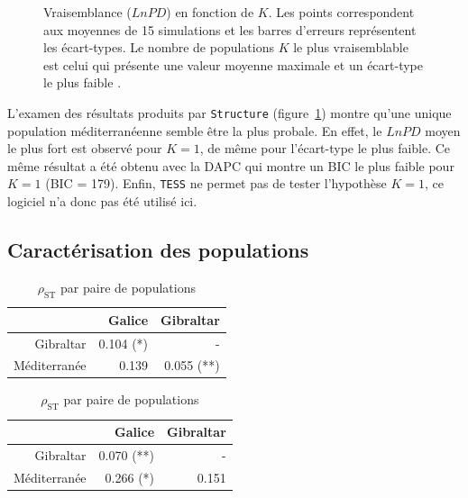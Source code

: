 \documentclass[a4paper,12pt,twoside]{article}\usepackage[]{graphicx}\usepackage[]{color}
\begin{document}
\begin {bibunit} [newbst]
\begin{figure}[htpb]
{}

\caption[Vraisemblance ($LnPD$) en fonction de $K$.]{Vraisemblance ($LnPD$) en fonction de $K$. Les points correspondent aux moyennes de 15 simulations et les barres d'erreurs représentent les écart-types. Le nombre de populations $K$ le plus vraisemblable est celui qui présente une valeur moyenne maximale et un écart-type le plus faible \citep{pritchard2000}.}\label{fig:lnpd2}
\end{figure}



L'examen des résultats produits par \texttt{Structure} (figure~\ref{fig:lnpd2}) montre qu'une unique population méditerranéenne semble être la plus probale. En effet, le $LnPD$ moyen le plus fort est observé pour $K=1$, de même pour l'écart-type le plus faible. Ce même résultat a été obtenu avec la DAPC qui montre un BIC le plus faible pour $K=1$ (BIC = 179). Enfin, \texttt{TESS} ne permet pas de tester l'hypothèse $K=1$, ce logiciel n'a donc pas été utilisé ici.

\subsection{Caractérisation des populations}

\begin{table}[htpb]
\begin{center}
\begin{minipage}{.48\textwidth}
\centering
\caption{$F_\textrm{ST}$ par paire de populations}
\label{table:fst}
\begin{tabular}{rrr}
\toprule
   &   Galice   &    Gibraltar    \\
\midrule
Gibraltar   &   0.104 (*) 	& - \\
Méditerranée   &   0.139 & 0.055 (**) \\
\bottomrule
\end{tabular}

\end{minipage}
\hfill
\begin{minipage}{.48\textwidth}
\centering
\caption{$\rho_\textrm{ST}$ par paire de populations}
\label{table:rho}
\begin{tabular}{rrr}
\toprule
   &   Galice   &    Gibraltar    \\
\midrule
Gibraltar   &   0.070 (**) 	& - \\
Méditerranée   &   0.266 (*) & 0.151 \\
\bottomrule
\end{tabular}


\end{minipage}
\end{center}
\end{table}
\end{bibunit}
\end{document}
